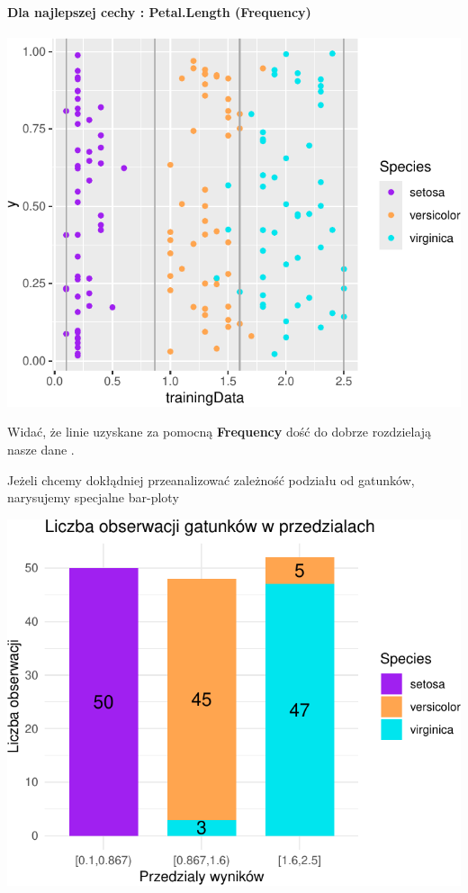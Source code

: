 \documentclass[
  12pt,
]{article}
\begin{document}
\paragraph{Dla najlepszej cechy : Petal.Length
(Frequency)}\label{dla-najlepszej-cechy-petal.length-frequency}

\begin{center}\includegraphics{Sprawozdanie2_files/figure-latex/frequences_najl-1} \end{center}

Widać, że linie uzyskane za pomocną \textbf{Frequency} dość do dobrze
rozdzielają nasze dane .

Jeżeli chcemy dokłądniej przeanalizować zależność podziału od gatunków,
narysujemy specjalne bar-ploty

\begin{center}\includegraphics{Sprawozdanie2_files/figure-latex/tabela_kondygnacji_1_najl-1} \end{center}
\end{document}
